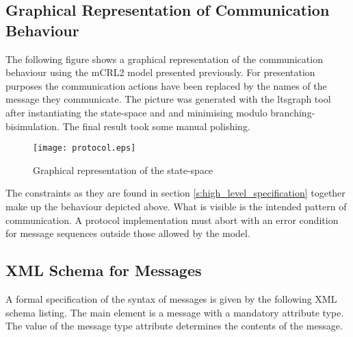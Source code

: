 \documentclass{article}
\begin{document}
  \subsection{Graphical Representation of Communication Behaviour}

   The following figure shows a graphical representation of the communication
   behaviour using the mCRL2 model presented previously. For presentation
   purposes the communication actions have been replaced by the names of the
   message they communicate.  The picture was generated with the ltsgraph tool
   after instantiating the state-space and and minimising modulo
   branching-bisimulation. The final result took some manual polishing.

  \begin{figure}[H]
   \texttt{[image: protocol.eps]}
   \caption{Graphical representation of the state-space}
  \end{figure}

   The constraints as they are found in section
   \ref{s:high_level_specification} together make up the behaviour depicted
   above. What is visible is the intended pattern of communication. A protocol
   implementation must abort with an error condition for message sequences
   outside those allowed by the model.

  \pagebreak

  \subsection{XML Schema for Messages}
  \label{subsection:xml_schema_messages}

  A formal specification of the syntax of messages is given by the following
  XML schema listing. The main element is a message with a mandatory attribute
  type. The value of the message type attribute determines the contents of the
  message.

  \small  \normalsize
   
\end{document}
